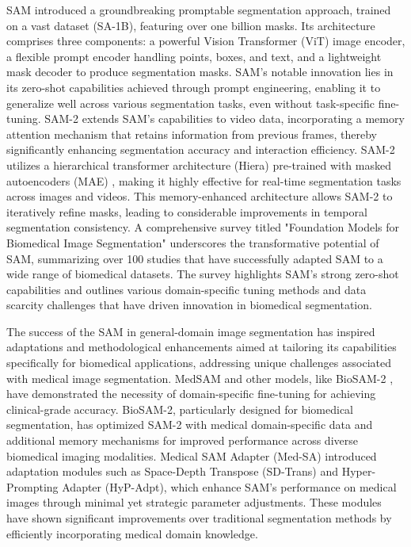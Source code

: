 \documentclass[./dissertation.tex]{subfiles}
\begin{document}

SAM \cite{kirillov2023segment} introduced a groundbreaking promptable segmentation approach, trained on a vast dataset (SA-1B), featuring over one billion masks. Its architecture comprises three components: a powerful Vision Transformer (ViT) image encoder, a flexible prompt encoder handling points, boxes, and text, and a lightweight mask decoder to produce segmentation masks. SAM's notable innovation lies in its zero-shot capabilities achieved through prompt engineering, enabling it to generalize well across various segmentation tasks, even without task-specific fine-tuning. SAM-2 \cite{ravi2024sam} extends SAM's capabilities to video data, incorporating a memory attention mechanism that retains information from previous frames, thereby significantly enhancing segmentation accuracy and interaction efficiency. SAM-2 utilizes a hierarchical transformer architecture (Hiera) \cite{ryali2023hiera,bolya2023window} pre-trained with masked autoencoders (MAE) \cite{he2022masked}, making it highly effective for real-time segmentation tasks across images and videos. This memory-enhanced architecture allows SAM-2 to iteratively refine masks, leading to considerable improvements in temporal segmentation consistency. A comprehensive survey titled "Foundation Models for Biomedical Image Segmentation" \cite{lee2024foundation} underscores the transformative potential of SAM, summarizing over 100 studies that have successfully adapted SAM to a wide range of biomedical datasets. The survey highlights SAM's strong zero-shot capabilities and outlines various domain-specific tuning methods and data scarcity challenges that have driven innovation in biomedical segmentation.



The success of the SAM in general-domain image segmentation has inspired adaptations and methodological enhancements aimed at tailoring its capabilities specifically for biomedical applications, addressing unique challenges associated with medical image segmentation. MedSAM \cite{ma2024segment} and other models, like BioSAM-2 \cite{yan2024biomedical}, have demonstrated the necessity of domain-specific fine-tuning for achieving clinical-grade accuracy. BioSAM-2, particularly designed for biomedical segmentation, has optimized SAM-2 with medical domain-specific data and additional memory mechanisms for improved performance across diverse biomedical imaging modalities. Medical SAM Adapter (Med-SA) \cite{wu2023medical} introduced adaptation modules such as Space-Depth Transpose (SD-Trans) and Hyper-Prompting Adapter (HyP-Adpt), which enhance SAM's performance on medical images through minimal yet strategic parameter adjustments. These modules have shown significant improvements over traditional segmentation methods by efficiently incorporating medical domain knowledge.
\end{document}
